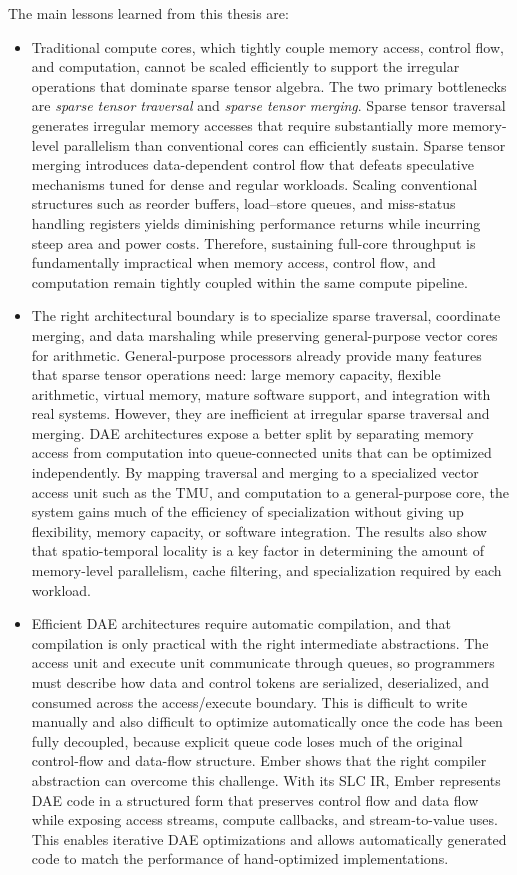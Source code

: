 The main lessons learned from this thesis are:
\begin{itemize}
    \item Traditional compute cores, which tightly couple memory access, control flow, and computation, cannot be scaled efficiently to support the irregular operations that dominate sparse tensor algebra. The two primary bottlenecks are \emph{sparse tensor traversal} and \emph{sparse tensor merging}. Sparse tensor traversal generates irregular memory accesses that require substantially more memory-level parallelism than conventional cores can efficiently sustain. Sparse tensor merging introduces data-dependent control flow that defeats speculative mechanisms tuned for dense and regular workloads. Scaling conventional structures such as reorder buffers, load--store queues, and miss-status handling registers yields diminishing performance returns while incurring steep area and power costs. Therefore, sustaining full-core throughput is fundamentally impractical when memory access, control flow, and computation remain tightly coupled within the same compute pipeline.
    \item The right architectural boundary is to specialize sparse traversal, coordinate merging, and data marshaling while preserving general-purpose vector cores for arithmetic. General-purpose processors already provide many features that sparse tensor operations need: large memory capacity, flexible arithmetic, virtual memory, mature software support, and integration with real systems. However, they are inefficient at irregular sparse traversal and merging. DAE architectures expose a better split by separating memory access from computation into queue-connected units that can be optimized independently. By mapping traversal and merging to a specialized vector access unit such as the TMU, and computation to a general-purpose core, the system gains much of the efficiency of specialization without giving up flexibility, memory capacity, or software integration. The results also show that spatio-temporal locality is a key factor in determining the amount of memory-level parallelism, cache filtering, and specialization required by each workload.
    \item Efficient DAE architectures require automatic compilation, and that compilation is only practical with the right intermediate abstractions. The access unit and execute unit communicate through queues, so programmers must describe how data and control tokens are serialized, deserialized, and consumed across the access/execute boundary. This is difficult to write manually and also difficult to optimize automatically once the code has been fully decoupled, because explicit queue code loses much of the original control-flow and data-flow structure. Ember shows that the right compiler abstraction can overcome this challenge. With its SLC IR, Ember represents DAE code in a structured form that preserves control flow and data flow while exposing access streams, compute callbacks, and stream-to-value uses. This enables iterative DAE optimizations and allows automatically generated code to match the performance of hand-optimized implementations.
\end{itemize}

